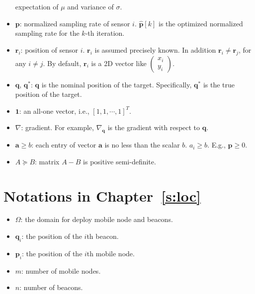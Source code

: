 \begin{itemize}
expectation of $\mu$ and variance of $\sigma$.
\item $\mathbf{p}$: normalized sampling rate of sensor $i$. %
$\hat{\mathbf{p}}[k]$ is the optimized normalized sampling rate for the $k$-th iteration.
\item $\mathbf{r}_{i}$: position of sensor $i$. $\mathbf{r}_{i}$ is assumed
precisely known. In addition $\mathbf{r}_{i}\neq\mathbf{r}_{j}$,
for any $i\neq j$. By default, $\mathbf{r}_{i}$ is a 2D vector like
$\left(\begin{array}{c}
x_{i}\\
y_{i}\end{array}\right)$. %
\item $\mathbf{q}$, $\mathbf{q}^\ast$: $\mathbf{q}$ is the nominal position of the target. Specifically, $\mathbf{q}^\ast$ is the true position of the target.
\item $\mathbf{1}$: an all-one vector, i.e., $[1, 1, \cdots, 1]^T$.
\item $\nabla$: gradient. For example, $\nabla_{\mathbf{q}}$ is the gradient
with respect to $\mathbf{q}$.
\item $\mathbf{a}\geq b$: each entry of vector $\mathbf{a}$ is no less than the scalar $b$. $a_{i}\geq b$. E.g., $\mathbf{p}\geq 0$.
\item $A\succeq B$: matrix $A-B$ is positive semi-definite.
\end{itemize}

\section{Notations in Chapter~\ref{s:loc}}
\begin{itemize}
\item $\Omega$: the domain for deploy mobile node and beacons.
\item $\mathbf{q}_i$: the position of the $i$th beacon.
\item $\mathbf{p}_i$: the position of the $i$th mobile node.
\item $m$: number of mobile nodes.
\item $n$: number of beacons.
\end{itemize}

